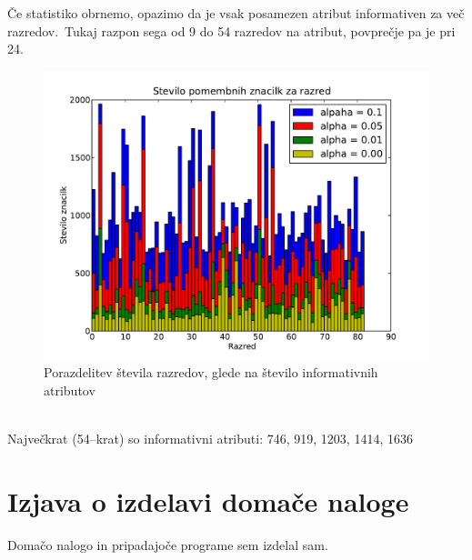 \documentclass[a4paper,11pt]{article}
\begin{document}
Če statistiko obrnemo, opazimo da je vsak posamezen atribut informativen za več razredov.~Tukaj razpon sega od 9 do 54 razredov na atribut, povprečje pa je pri 24.
\begin{figure}[H]
\begin{center}
\includegraphics[scale=0.6]{mu.pdf}
\caption{Porazdelitev števila razredov, glede na število informativnih atributov}
\label{slika1}
\end{center}
\end{figure}\ \\[-40pt]

Največkrat (54--krat) so informativni atributi: 746, 919, 1203, 1414, 1636

\section{Izjava o izdelavi domače naloge}
Domačo nalogo in pripadajoče programe sem izdelal sam.
\end{document}
